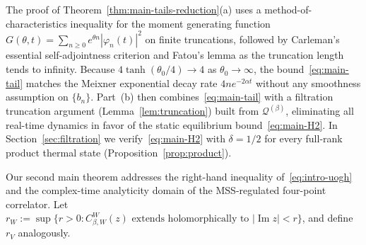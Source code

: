 \documentclass[11pt,a4paper]{article}
\numberwithin{equation}{section}
\theoremstyle{plain}
\theoremstyle{definition}
\begin{document}
The proof of Theorem~\ref{thm:main-tails-reduction}(a) uses a method-of-characteristics inequality for the moment generating function $G(\theta,t)=\sum_{n\ge 0} e^{\theta n}|\varphi_n(t)|^2$ on finite truncations, followed by Carleman's essential self-adjointness criterion and Fatou's lemma as the truncation length tends to infinity. Because $4\tanh(\theta_0/4)\to 4$ as $\theta_0\to\infty$, the bound~\eqref{eq:main-tail} matches the Meixner exponential decay rate $4ne^{-2\alpha t}$ without any smoothness assumption on $\{b_n\}$. Part~(b) then combines~\eqref{eq:main-tail} with a filtration truncation argument (Lemma~\ref{lem:truncation}) built from $\mathcal{Q}^{(\beta)}$, eliminating all real-time dynamics in favor of the static equilibrium bound~\eqref{eq:main-H2}. In Section~\ref{sec:filtration} we verify~\eqref{eq:main-H2} with $\delta=1/2$ for every full-rank product thermal state (Proposition~\ref{prop:product}).

Our second main theorem addresses the right-hand inequality of~\eqref{eq:intro-uogh} and the complex-time analyticity domain of the MSS-regulated four-point correlator. Let $r_W := \sup\{r > 0 : C_{\beta,W}^W(z)\text{ extends holomorphically to }|\operatorname{Im}z|<r\}$, and define $r_V$ analogously.
\end{document}
